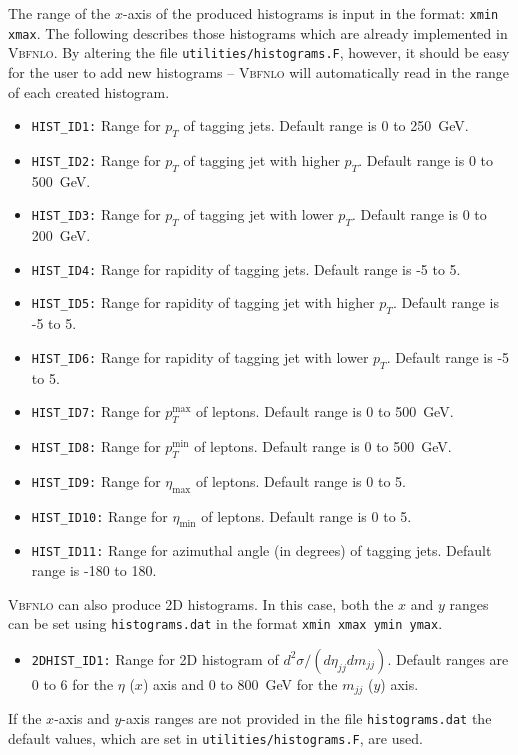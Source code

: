 \documentclass[english,12pt]{article}
\begin{document}
\noindent The range of the $x$-axis of the produced histograms is input in the format: {\tt xmin xmax}. 
The following describes those histograms which are already implemented in
\textsc{Vbfnlo}.  By altering the file {\tt utilities/histograms.F}, however, it
should be easy for the user to add new histograms -- \textsc{Vbfnlo} will
automatically read in the range of each created histogram.
\begin{itemize}
 \item {\tt HIST\_ID1:} Range for $p_{T}$ of tagging jets.  Default range is 0
to 250~GeV.
 \item {\tt HIST\_ID2:} Range for $p_{T}$ of tagging jet with higher $p_{T}$.
Default range is 0 to 500~GeV.
 \item {\tt HIST\_ID3:}  Range for $p_{T}$ of tagging jet with lower
$p_{T}$. Default range is 0 to 200~GeV.   
 \item {\tt HIST\_ID4:} Range for rapidity of tagging jets.  Default
range is -5 to 5.
 \item {\tt HIST\_ID5:} Range for rapidity of tagging jet with higher $p_{T}$. 
Default range is -5 to 5.  
 \item {\tt HIST\_ID6:} Range for rapidity of tagging jet with lower $p_{T}$. 
Default range is -5 to 5.
 \item {\tt HIST\_ID7:} Range for $p_{T}^{\max}$ of leptons.  Default range
is 0 to 500~GeV.
 \item {\tt HIST\_ID8:} Range for $p_{T}^{\min}$ of leptons.  Default range
is 0 to 500~GeV. 
 \item {\tt HIST\_ID9:} Range for $\eta_{\max}$ of leptons.  Default range
is 0 to 5.
 \item {\tt HIST\_ID10:} Range for $\eta_{\min}$ of leptons.  Default range
is 0 to 5.
 \item {\tt HIST\_ID11:} Range for azimuthal angle (in degrees) of tagging jets.  
Default range is -180 to 180.
\end{itemize}
\textsc{Vbfnlo} can also produce 2D histograms.  In this case, both the $x$ and
$y$ ranges can be set using {\tt histograms.dat} in the format {\tt xmin xmax
ymin ymax}.
\begin{itemize}
 \item {\tt 2DHIST\_ID1:} Range for 2D histogram of $d^{2}\sigma /(d\eta_{jj}
dm_{jj})$.  Default ranges are 0 to 6 for the $\eta$ ($x$) axis and 0 to 800~GeV
for the $m_{jj}$ ($y$) axis.
\end{itemize}
If the $x$-axis and $y$-axis ranges are not provided in the file {\tt histograms.dat} the
default values, which are set in {\tt utilities/histograms.F}, are used.
\end{document}
